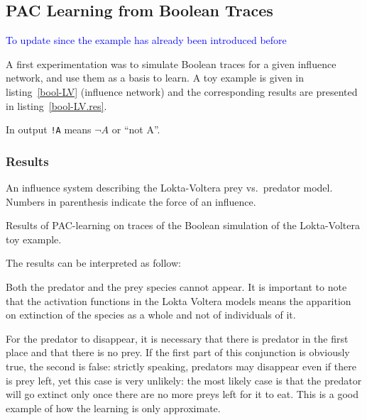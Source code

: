 \documentclass{llncs}
\newcommand{\francois}[1]{\textcolor{blue}{#1}}
\begin{document}
\subsection{PAC Learning from Boolean Traces}

\francois{To update since the example has already been introduced before}

A first experimentation was to simulate Boolean traces for a given influence network, and use them as a basis to learn. 
A toy example is given in listing~\ref{bool-LV} (influence network) and the corresponding results are presented in listing~\ref{bool-LV.res}.

In output \texttt{!A} means $\neg A$ or ``not A''.

\subsubsection{Results}

\begin{listfig}[htp]
	
	\caption{An influence system describing the Lokta-Voltera prey vs.\ predator model. Numbers in parenthesis indicate the force of an influence.\label{bool-LV}}
\end{listfig}
\begin{listfig}[htp]
	
	\caption{Results of PAC-learning on traces of the Boolean simulation of the Lokta-Voltera toy example.\label{bool-LV.res}}
\end{listfig}

The results can be interpreted as follow:

Both the predator and the prey species cannot appear. It is important to note that the activation functions in the Lokta Voltera models means the apparition on extinction of the species as a whole and not of individuals of it.

For the predator to disappear, it is necessary that there is predator in the first place and that there is no prey. If the first part of this conjunction is obviously true, the second is false: strictly speaking, predators may disappear even if there is prey left, yet this case is very unlikely: the most likely case is that the predator will go extinct only once there are no more preys left for it to eat. This is a good example of how the learning is only approximate.
\end{document}
